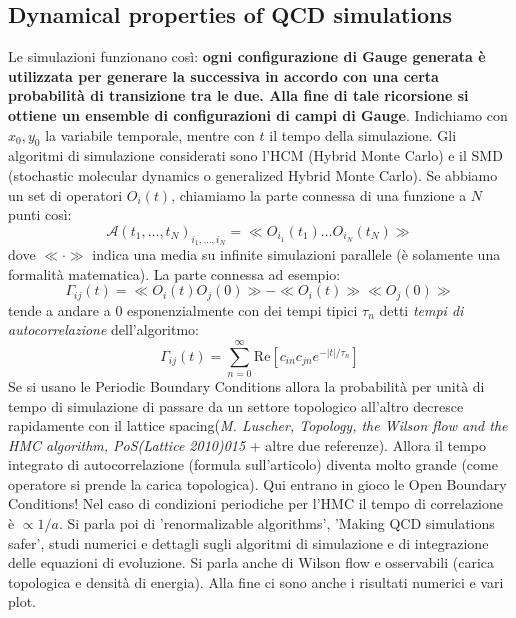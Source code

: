 \documentclass[12pt,a4paper,openright]{article}
\newcommand{\colg}{\textcolor{PineGreen}}
\newcommand{\colr}{\textcolor{BrickRed}}
\newcommand{\obc}{Open Boundary Conditions}
\begin{document}
\subsection{Dynamical properties of QCD simulations}
Le simulazioni funzionano così: \colg{\bf ogni configurazione di Gauge generata è utilizzata per generare la successiva in accordo con una certa probabilità di transizione tra le due. Alla fine di tale ricorsione si ottiene un ensemble di configurazioni di campi di Gauge}.
Indichiamo con $x_0, y_0$ la variabile temporale, mentre con $t$ il tempo della simulazione.
\newline
Gli algoritmi di simulazione considerati sono l'HCM (Hybrid Monte Carlo) e il SMD (stochastic molecular dynamics o generalized Hybrid Monte Carlo).
\newline
Se abbiamo un set di operatori $O_i (t)$, chiamiamo la parte connessa di una funzione a $N$ punti così:
\begin{equation*}
  \mathcal{A}(t_1,\dots,t_N)_{i_1,\dots,i_N} = \ll O_{i_1}(t_1) \dots O_{i_N}(t_N) \gg 
\end{equation*}
dove $\ll \cdot \gg$ indica una media su infinite simulazioni parallele (è solamente una formalità matematica).
La parte connessa ad esempio:
\begin{equation*}
  \Gamma_{ij} (t) = \ll O_i (t) O_j(0) \gg - \ll O_i (t) \gg \ll O_j(0) \gg
\end{equation*}
tende a \colg{andare a 0 esponenzialmente con dei tempi tipici $\tau_n$ detti {\it tempi di autocorrelazione}} dell'algoritmo:
\begin{equation*}
  \Gamma_{ij} (t) = \sum_{n=0}^\infty \text{Re} \left[ c_{in} c_{jn} e^{-|t|/\tau_n}\right]
\end{equation*}
Se si usano le Periodic Boundary Conditions allora la probabilità per unità di tempo di simulazione di passare da un settore topologico all'altro decresce rapidamente con il lattice spacing({\it M. Luscher, Topology, the Wilson flow and the HMC algorithm, PoS(Lattice 2010)015} +  altre due referenze).
Allora il tempo integrato di autocorrelazione (formula sull'articolo) diventa molto grande (come operatore si prende la carica topologica).
\colg{Qui entrano in gioco le \obc!}
Nel caso di condizioni periodiche per l'HMC il tempo di correlazione è $\propto 1/a$.
\newline\newline
\colr{Si parla poi di 'renormalizable algorithms', 'Making QCD simulations safer', studi numerici e dettagli sugli algoritmi di simulazione e di integrazione delle equazioni di evoluzione.
Si parla anche di Wilson flow e osservabili (carica topologica e densità di energia). Alla fine ci sono anche i risultati numerici e vari plot.}
\end{document}
